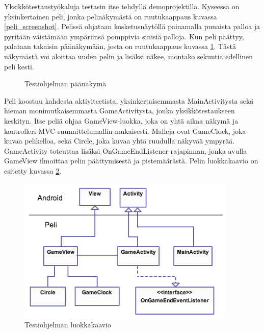 Yksikkötestaustyökaluja testasin itse tehdyllä demoprojektilla. Kyseessä on yksinkertainen peli, jonka pelinäkymästä on ruutukaappaus kuvassa \ref{peli_screenshot}. Pelissä ohjataan kosketusnäytöllä painamalla punaista palloa ja pyritään väistämään ympäriinsä pomppivia sinisiä palloja. Kun peli päättyy, palataan takaisin päänäkymään, josta on ruutukaappaus kuvassa \ref{mainactivity}. Tästä näkymästä voi aloittaa uuden pelin ja lisäksi näkee, montako sekuntia edellinen peli kesti.

\begin{figure}[h]
\centering
{}
\caption{Testiohjelman päänäkymä} \label{mainactivity}
\end{figure}

Peli koostuu kahdesta aktiviteetista, yksinkertaisemmasta MainActivitysta sekä hieman monimutkaisemmasta GameActivitysta, jonka yksikkötestaukseen keskityn. Itse peliä ohjaa GameView-luokka, joka on yhtä aikaa näkymä ja kontrolleri MVC-suunnittelumallin mukaisesti. Malleja ovat GameClock, joka kuvaa pelikelloa, sekä Circle, joka kuvaa yhtä ruudulla näkyvää ympyrää. GameActivity toteuttaa lisäksi OnGameEndListener-rajapinnan, jonka avulla GameView ilmoittaa pelin päättymisestä ja pistemäärästä. Pelin luokkakaavio on esitetty kuvassa \ref{game_classdiagram}.

\begin{figure}[h]
\centering
\includegraphics[width=105mm]{peli_luokkakaavio.png}
\caption{Testiohjelman luokkakaavio} \label{game_classdiagram}
\end{figure}

